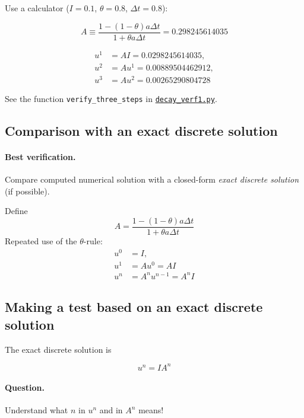 \documentclass[%
oneside,                 %
final,                   %
10pt]{article}
\begin{document}
Use a calculator ($I=0.1$, $\theta=0.8$, $\Delta t =0.8$):

\[ A\equiv \frac{1 - (1-\theta) a\Delta t}{1 + \theta a \Delta t} = 0.298245614035\]

\begin{align*}
u^1 &= AI=0.0298245614035,\\ 
u^2 &= Au^1= 0.00889504462912,\\ 
u^3 &=Au^2= 0.00265290804728
\end{align*}

See the function \Verb!verify_three_steps! in \href{{http://tinyurl.com/ofkw6kc/alg/decay_verf1.py}}{\nolinkurl{decay_verf1.py}}.

\subsection*{Comparison with an exact discrete solution}


\paragraph{Best verification.}
Compare computed numerical solution
with a closed-form \emph{exact discrete solution} (if possible).



Define
\[ A = \frac{1 - (1-\theta) a\Delta t}{1 + \theta a \Delta t}\]
Repeated use of the $\theta$-rule:
\begin{align*}
u^0 &= I,\\ 
u^1 &= Au^0 = AI\\ 
u^n &= A^nu^{n-1} = A^nI
\end{align*}

\subsection*{Making a test based on an exact discrete solution}

The exact discrete solution is

\begin{equation}
u^n = IA^n
\label{decay:un:exact}
\end{equation}


\paragraph{Question.}
Understand what $n$ in $u^n$ and in $A^n$ means!
\end{document}
